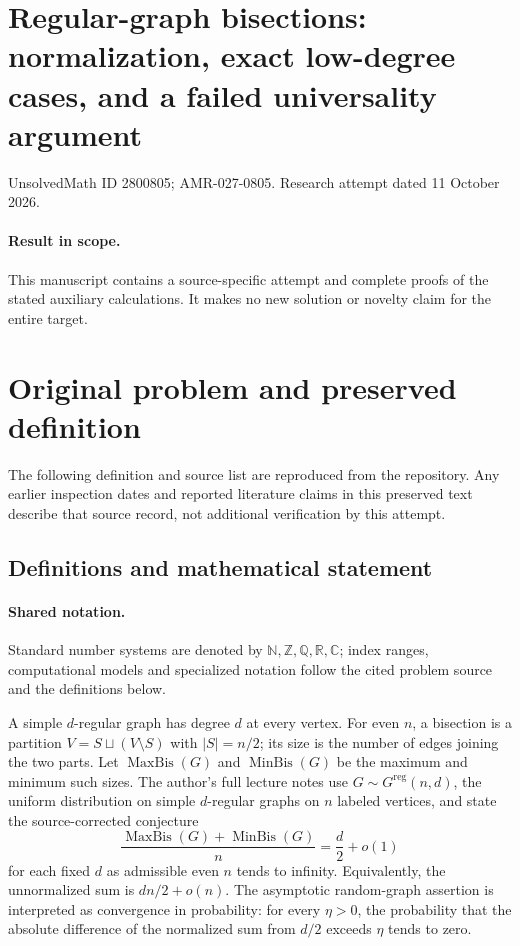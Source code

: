 \documentclass[11pt]{article}
\begin{document}
\section*{Regular-graph bisections: normalization, exact low-degree cases, and a failed universality argument}
\noindent UnsolvedMath ID 2800805; AMR-027-0805. Research attempt dated 11 October 2026.
\paragraph{Result in scope.}This manuscript contains a source-specific attempt and complete proofs of the stated auxiliary calculations. It makes no new solution or novelty claim for the entire target.
\section{Original problem and preserved definition}
The following definition and source list are reproduced from the repository. Any earlier inspection dates and reported literature claims in this preserved text describe that source record, not additional verification by this attempt.
\subsection{Definitions and mathematical statement}

\paragraph{Shared notation.}Standard number systems are denoted by $\mathbb N,\mathbb Z,\mathbb Q,\mathbb R,\mathbb C$; index ranges, computational models and specialized notation follow the cited problem source and the definitions below.


A simple $d$-regular graph has degree $d$ at every vertex. For even $n$, a bisection is a partition $V=S\sqcup(V\setminus S)$ with $|S|=n/2$; its size is the number of edges joining the two parts. Let $\operatorname{MaxBis}(G)$ and $\operatorname{MinBis}(G)$ be the maximum and minimum such sizes. The author's full lecture notes use $G\sim G^{\mathrm{reg}}(n,d)$, the uniform distribution on simple $d$-regular graphs on $n$ labeled vertices, and state the source-corrected conjecture
\[
 \frac{\operatorname{MaxBis}(G)+\operatorname{MinBis}(G)}{n}
 =\frac d2+o(1)
\]
for each fixed $d$ as admissible even $n$ tends to infinity. Equivalently, the unnormalized sum is $dn/2+o(n)$. The asymptotic random-graph assertion is interpreted as convergence in probability: for every $\eta>0$, the probability that the absolute difference of the normalized sum from $d/2$ exceeds $\eta$ tends to zero.
\end{document}
